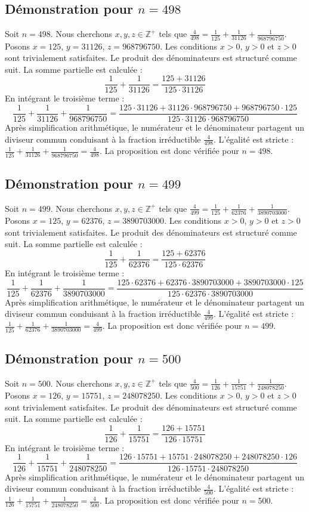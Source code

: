 \documentclass[11pt,a4paper]{article}
\begin{document}
\subsection{Démonstration pour $n = 498$}
Soit $n = 498$. Nous cherchons $x, y, z \in \mathbb{Z}^{+}$ tels que $\frac{4}{498} = \frac{1}{125} + \frac{1}{31126} + \frac{1}{968796750}$.
Posons $x = 125$, $y = 31126$, $z = 968796750$.
Les conditions $x > 0$, $y > 0$ et $z > 0$ sont trivialement satisfaites.
Le produit des dénominateurs est structuré comme suit. La somme partielle est calculée :
$$ \frac{1}{125} + \frac{1}{31126} = \frac{125+31126}{125 \cdot 31126} $$
En intégrant le troisième terme :
$$ \frac{1}{125} + \frac{1}{31126} + \frac{1}{968796750} = \frac{125 \cdot 31126 + 31126 \cdot 968796750 + 968796750 \cdot 125}{125 \cdot 31126 \cdot 968796750} $$
Après simplification arithmétique, le numérateur et le dénominateur partagent un diviseur commun conduisant à la fraction irréductible $\frac{4}{498}$.
L'égalité est stricte : $\frac{1}{125} + \frac{1}{31126} + \frac{1}{968796750} = \frac{4}{498}$.
La proposition est donc vérifiée pour $n = 498$.
\subsection{Démonstration pour $n = 499$}
Soit $n = 499$. Nous cherchons $x, y, z \in \mathbb{Z}^{+}$ tels que $\frac{4}{499} = \frac{1}{125} + \frac{1}{62376} + \frac{1}{3890703000}$.
Posons $x = 125$, $y = 62376$, $z = 3890703000$.
Les conditions $x > 0$, $y > 0$ et $z > 0$ sont trivialement satisfaites.
Le produit des dénominateurs est structuré comme suit. La somme partielle est calculée :
$$ \frac{1}{125} + \frac{1}{62376} = \frac{125+62376}{125 \cdot 62376} $$
En intégrant le troisième terme :
$$ \frac{1}{125} + \frac{1}{62376} + \frac{1}{3890703000} = \frac{125 \cdot 62376 + 62376 \cdot 3890703000 + 3890703000 \cdot 125}{125 \cdot 62376 \cdot 3890703000} $$
Après simplification arithmétique, le numérateur et le dénominateur partagent un diviseur commun conduisant à la fraction irréductible $\frac{4}{499}$.
L'égalité est stricte : $\frac{1}{125} + \frac{1}{62376} + \frac{1}{3890703000} = \frac{4}{499}$.
La proposition est donc vérifiée pour $n = 499$.
\subsection{Démonstration pour $n = 500$}
Soit $n = 500$. Nous cherchons $x, y, z \in \mathbb{Z}^{+}$ tels que $\frac{4}{500} = \frac{1}{126} + \frac{1}{15751} + \frac{1}{248078250}$.
Posons $x = 126$, $y = 15751$, $z = 248078250$.
Les conditions $x > 0$, $y > 0$ et $z > 0$ sont trivialement satisfaites.
Le produit des dénominateurs est structuré comme suit. La somme partielle est calculée :
$$ \frac{1}{126} + \frac{1}{15751} = \frac{126+15751}{126 \cdot 15751} $$
En intégrant le troisième terme :
$$ \frac{1}{126} + \frac{1}{15751} + \frac{1}{248078250} = \frac{126 \cdot 15751 + 15751 \cdot 248078250 + 248078250 \cdot 126}{126 \cdot 15751 \cdot 248078250} $$
Après simplification arithmétique, le numérateur et le dénominateur partagent un diviseur commun conduisant à la fraction irréductible $\frac{4}{500}$.
L'égalité est stricte : $\frac{1}{126} + \frac{1}{15751} + \frac{1}{248078250} = \frac{4}{500}$.
La proposition est donc vérifiée pour $n = 500$.
\end{document}
